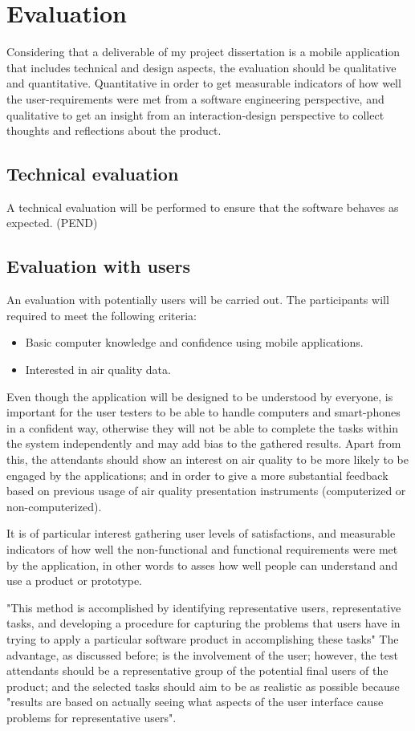 \section{Evaluation}
Considering that a deliverable of my project dissertation is a mobile application that includes technical and design aspects, the evaluation should be qualitative and quantitative. Quantitative in order to get measurable indicators of how well the user-requirements were met from a software engineering perspective, and qualitative to get an insight from an interaction-design perspective to collect thoughts and reflections about the product.

\subsection{Technical evaluation}
A technical evaluation will be performed to ensure that the software behaves as expected. (PEND)


\subsection{Evaluation with users}
An evaluation with potentially users will be carried out. The participants will required to meet the following criteria:
\begin{itemize}
	\item Basic computer knowledge and confidence using mobile applications.
	\item Interested in air quality data.
\end{itemize}

Even though the application will be designed to be understood by everyone, is important for the user testers to be able to handle computers and smart-phones in a confident way, otherwise they will not be able to complete the tasks within the system independently and may add bias to the gathered results. Apart from this, the attendants should show an interest on air quality to be more likely to be engaged by the applications; and in order to give a more substantial feedback based on previous usage of air quality presentation instruments (computerized or non-computerized).

It is of particular interest gathering user levels of satisfactions, and measurable indicators of how well the non-functional and functional requirements were met by the application, in other words to asses how well people can understand and use a product or prototype.

"This method is accomplished by identifying representative users, representative tasks, and developing a procedure for capturing the problems that users have in trying to apply a particular software product in accomplishing these tasks" \cite{Scholtz2003} The advantage, as discussed before; is the involvement of the user; however, the test attendants should be a representative group of the potential final users of the product; and the selected tasks should aim to be as realistic as possible because "results are based on actually seeing what aspects of the user interface cause problems for representative users". \cite{Scholtz2003}

